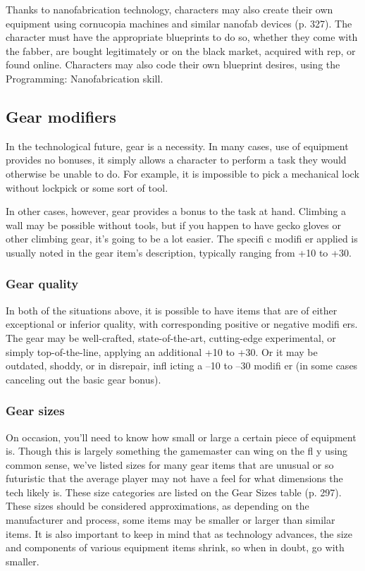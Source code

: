 Thanks to nanofabrication technology, characters may
also create their own equipment using cornucopia
machines and similar nanofab devices (p. 327). The
character must have the appropriate blueprints to do
so, whether they come with the fabber, are bought
legitimately or on the black market, acquired with rep,
or found online. Characters may also code their own
blueprint desires, using the Programming: Nanofabrication
skill.


\subsection{Gear modifiers}
\label{sec:gear-modifiers}

In the technological future, gear is a necessity. In many
cases, use of equipment provides no bonuses, it simply
allows a character to perform a task they would otherwise
be unable to do. For example, it is impossible
to pick a mechanical lock without lockpick or some
sort of tool.

In other cases, however, gear provides a bonus to
the task at hand. Climbing a wall may be possible
without tools, but if you happen to have gecko gloves
or other climbing gear, it’s going to be a lot easier. The
specifi c modifi er applied is usually noted in the gear
item’s description, typically ranging from +10 to +30.

\subsubsection{Gear quality}

In both of the situations above, it is possible to have
items that are of either exceptional or inferior quality,
with corresponding positive or negative modifi ers. The
gear may be well-crafted, state-of-the-art, cutting-edge
experimental, or simply top-of-the-line, applying an
additional +10 to +30. Or it may be outdated, shoddy,
or in disrepair, infl icting a –10 to –30 modifi er (in
some cases canceling out the basic gear bonus).

\subsubsection{Gear sizes}

On occasion, you’ll need to know how small or large
a certain piece of equipment is. Though this is largely
something the gamemaster can wing on the fl y using
common sense, we’ve listed sizes for many gear items
that are unusual or so futuristic that the average player
may not have a feel for what dimensions the tech
likely is. These size categories are listed on the Gear
Sizes table (p. 297). These sizes should be considered
approximations, as depending on the manufacturer
and process, some items may be smaller or larger than
similar items. It is also important to keep in mind that
as technology advances, the size and components of
various equipment items shrink, so when in doubt, go
with smaller.


